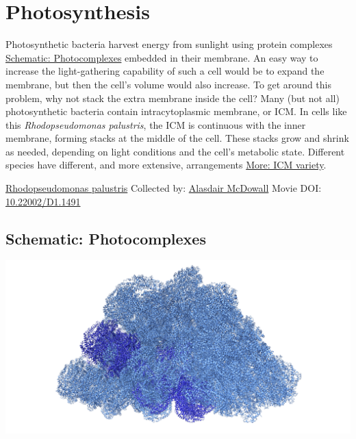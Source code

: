 \documentclass[]{tufte-book}
\begin{document}
\hypertarget{photosynthesis}{%
\section{Photosynthesis}\label{photosynthesis}}

Photosynthetic bacteria harvest energy from sunlight using protein complexes \protect\hyperlink{Photocomplexes}{Schematic: Photocomplexes} embedded in their membrane. An easy way to increase the light-gathering capability of such a cell would be to expand the membrane, but then the cell's volume would also increase. To get around this problem, why not stack the extra membrane inside the cell? Many (but not all) photosynthetic bacteria contain intracytoplasmic membrane, or ICM. In cells like this \emph{Rhodopseudomonas palustris}, the ICM is continuous with the inner membrane, forming stacks at the middle of the cell. These stacks grow and shrink as needed, depending on light conditions and the cell's metabolic state. Different species have different, and more extensive, arrangements \protect\hyperlink{ICM_variety}{More: ICM variety}.



\hypertarget{htmlwidget-cc97a2201688c525ab5b}{}

\label{fig:4-3}\protect\hyperlink{tree}{Rhodopseudomonas palustris} Collected by: \protect\hyperlink{alasdair_mcdowall}{Alasdair McDowall} Movie DOI: \href{https://doi.org/10.22002/D1.1491}{10.22002/D1.1491}

\hypertarget{Photocomplexes}{%
\subsection*{Schematic: Photocomplexes}\label{Photocomplexes}}

\includegraphics{img/schematics/4_3_1}
\end{document}
